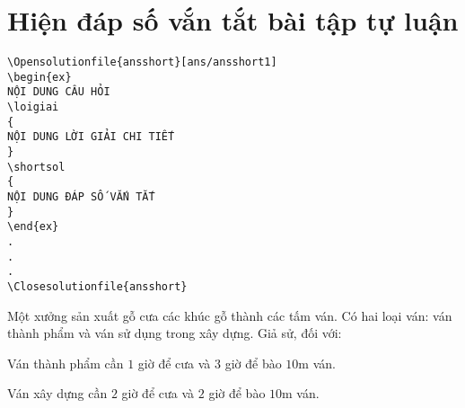 \documentclass[12pt,a4paper,oneside]{article}
\begin{document}
\section{Hiện đáp số vắn tắt bài tập tự luận}
\begin{verbatim}
\Opensolutionfile{ansshort}[ans/ansshort1]
\begin{ex}
NỘI DUNG CÂU HỎI
\loigiai
{
NỘI DUNG LỜI GIẢI CHI TIẾT
}
\shortsol
{
NỘI DUNG ĐÁP SỐ VẮN TẮT
}
\end{ex}
.
.
.
\Closesolutionfile{ansshort}
\end{verbatim}
\begin{ex}
	Một xưởng sản xuất gỗ cưa các khúc gỗ thành
	các tấm ván. Có hai loại ván: ván thành phẩm và ván sử dụng trong xây
	dựng. Giả sử, đối với:
	
	Ván thành phẩm cần $1$ giờ để cưa và $3$ giờ để bào $10$m ván.
	
	Ván xây dựng cần $2$ giờ để cưa và $2$ giờ để bào $10$m ván.
	

\end{ex}
\end{document}
